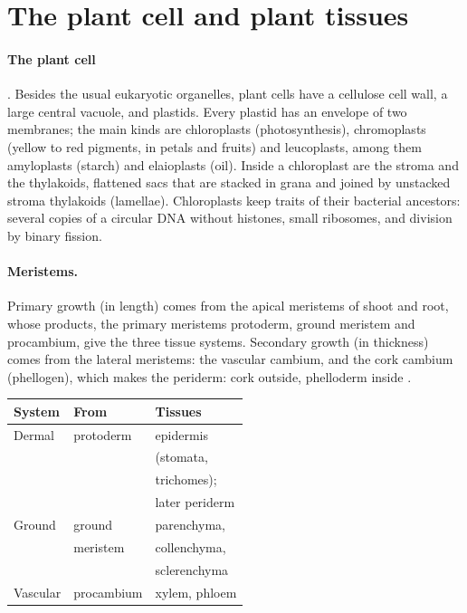 \section{The plant cell and plant tissues}
\label{section-tissues}

\paragraph{The plant cell}
\cite[Chapter 3]{evert2013raven}. Besides
the usual eukaryotic organelles, plant
cells have a cellulose cell wall, a large
central vacuole, and plastids. Every
plastid has an envelope of two membranes;
the main kinds are chloroplasts
(photosynthesis), chromoplasts (yellow to
red pigments, in petals and fruits) and
leucoplasts, among them amyloplasts (starch)
and elaioplasts (oil). Inside a chloroplast
are the stroma and the thylakoids, flattened
sacs that are stacked in grana and joined by
unstacked stroma thylakoids (lamellae).
Chloroplasts keep traits of their bacterial
ancestors: several copies of a circular DNA
without histones, small ribosomes, and
division by binary fission.

\paragraph{Meristems.}
Primary growth (in length) comes from the
apical meristems of shoot and root, whose
products, the primary meristems protoderm,
ground meristem and procambium, give the
three tissue systems. Secondary growth (in
thickness) comes from the lateral
meristems: the vascular cambium, and the
cork cambium (phellogen), which makes the
periderm: cork outside, phelloderm inside
\cite[Chapters 23, 26]{evert2013raven}.

\begin{center}
\begin{tabular}{lll}
System & From & Tissues \\
\hline
Dermal & protoderm & epidermis \\
& & (stomata, \\
& & trichomes); \\
& & later periderm \\
Ground & ground & parenchyma, \\
& meristem & collenchyma, \\
& & sclerenchyma \\
Vascular & procambium & xylem, phloem \\
\end{tabular}
\end{center}

